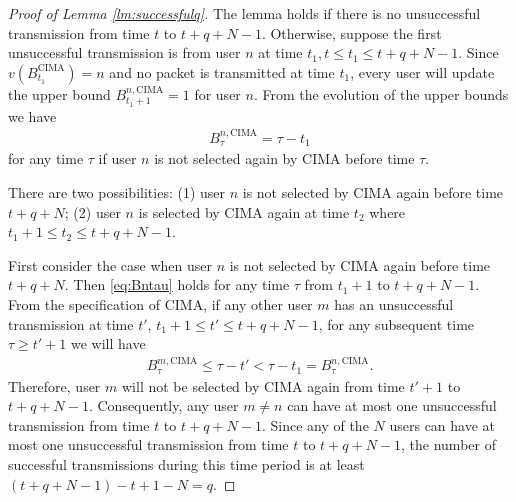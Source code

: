 \documentclass[onecolumn,draftcls]{IEEEtran}
\newcommand{\g}{\text{CIMA}}
\begin{document}
\section{}
\label{app:lm4}
\begin{proof}[Proof of Lemma \ref{lm:successfulq}]
The lemma holds if there is no unsuccessful transmission from time $t$ to $t+q+N-1$.
Otherwise, suppose the first unsuccessful transmission is from user $n$ at time $t_1, t\leq t_1\leq t+q+N-1$.
Since $v(B^{\g}_{t_1})=n$ and no packet is transmitted at time $t_1$, every user will update the upper bound $B^{n,\g}_{t_1+1} = 1$ for user $n$.
From the evolution of the upper bounds we have
\begin{align}
B^{n,\g}_{\tau} = \tau-t_1
\label{eq:Bntau}
\end{align}
for any time $\tau$ if user $n$ is not selected again by $\g$ before time $\tau$.

There are two possibilities: (1) user $n$ is not selected by $\g$ again before time $t+q+N$; (2) user $n$ is selected by $\g$ again at time $t_2$ where $t_1+1\leq t_2\leq t+q+N-1$.

First consider the case when user $n$ is not selected by $\g$ again before time $t+q+N$.
Then \eqref{eq:Bntau} holds for any time $\tau$ from $t_1+1$ to $t+q+N-1$. 
From the specification of $\g$, if any other user $m$ has an unsuccessful transmission at time $t'$, $t_1+1\leq t' \leq t+q+N-1$,
for any subsequent time $\tau \geq t'+1 $ we will have
\begin{align}
B^{m,\g}_{\tau} \leq \tau-t' < \tau-t_1 = B^{n,\g}_{\tau}.
\end{align}
Therefore, user $m$ will not be selected by $\g$ again from time $t'+1$ to $t+q+N-1$. Consequently, any user $m \neq n$ can have at most one unsuccessful transmission from time $t$ to $t+q+N-1$.
Since any of the $N$ users can have at most one unsuccessful transmission from time $t$ to $t+q+N-1$, the number of successful transmissions during this time period is at least $(t+q+N -1)-t+1- N = q$.


\end{proof}
\end{document}
